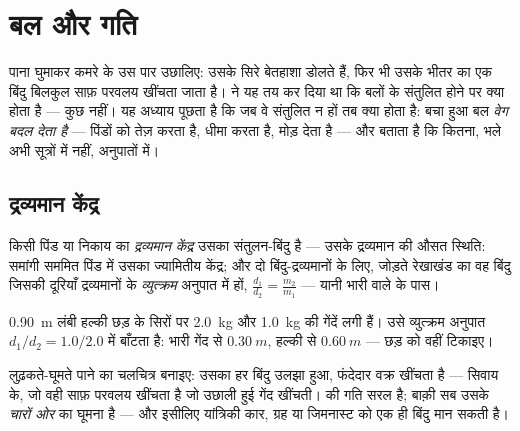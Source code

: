 \chapter{बल और गति}\label{ch:g11:forces-and-motion}

पाना घुमाकर कमरे के उस पार उछालिए: उसके सिरे बेतहाशा डोलते हैं, फिर भी उसके
भीतर का एक बिंदु बिलकुल साफ़ परवलय खींचता जाता है।  ने यह तय कर दिया था
कि बलों के संतुलित होने पर क्या होता है --- कुछ नहीं। यह
अध्याय पूछता है कि जब वे संतुलित न हों तब क्या होता है: बचा हुआ बल
\emph{वेग बदल देता है} --- पिंडों को तेज़ करता है, धीमा करता है, मोड़ देता
है --- और बताता है कि कितना, भले अभी सूत्रों में नहीं, अनुपातों में।

\section{द्रव्यमान केंद्र}

\begin{definition}[द्रव्यमान केंद्र]\label{def:g11:forces-and-motion:com}
किसी पिंड या निकाय का \emph{द्रव्यमान केंद्र} उसका
संतुलन-बिंदु है --- उसके द्रव्यमान की औसत स्थिति: समांगी सममित पिंड में उसका
ज्यामितीय केंद्र; और दो बिंदु-द्रव्यमानों के लिए, जोड़ते रेखाखंड का वह बिंदु
जिसकी दूरियाँ द्रव्यमानों के \emph{व्युत्क्रम} अनुपात में हों, $\frac{d_1}{d_2} = \frac{m_2}{m_1}$ ---
यानी भारी वाले के पास।
\end{definition}

\begin{example}[बेढब डंबल]\label{ex:g11:forces-and-motion:dumbbell}
\qty{0.90}{m} लंबी हल्की छड़ के सिरों पर \qty{2.0}{kg} और \qty{1.0}{kg} की गेंदें लगी हैं।
 उसे व्युत्क्रम अनुपात $d_1/d_2 = 1.0/2.0$ में बाँटता है: भारी
गेंद से $\qty{0.30}{m}$, हल्की से $\qty{0.60}{m}$ --- छड़ को वहीं टिकाइए।
\end{example}

\begin{remark}[उछाला हुआ पाना]\label{rem:g11:forces-and-motion:wrench}
लुढ़कते-घूमते पाने का चलचित्र बनाइए: उसका हर बिंदु उलझा हुआ, फंदेदार वक्र
खींचता है --- सिवाय  के, जो वही साफ़ परवलय खींचता है
जो उछाली हुई गेंद खींचती।  की गति सरल है; बाक़ी सब
उसके \emph{चारों ओर} का घूमना है --- और इसीलिए यांत्रिकी कार, ग्रह या
जिमनास्ट को एक ही बिंदु मान सकती है।
\end{remark}

